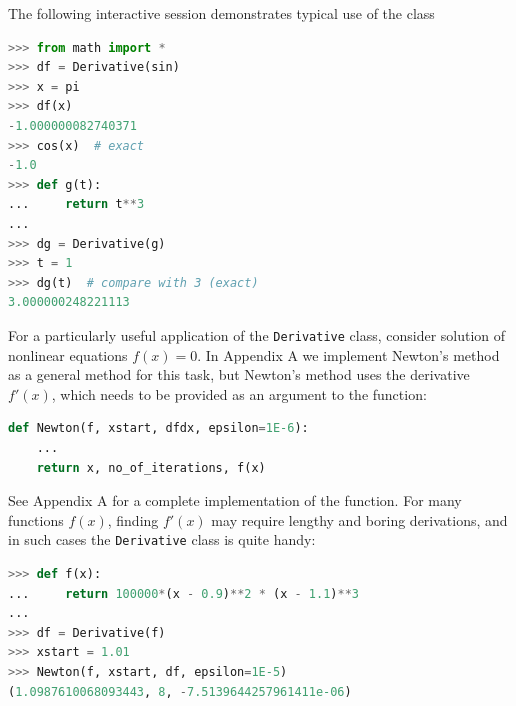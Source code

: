 \documentclass[graybox,envcountchap,sectrefs,final]{svmonodo}
\begin{document}
The following interactive session demonstrates typical use of the class
\begin{lstlisting}[language=Python,style=blue1]
>>> from math import *
>>> df = Derivative(sin)
>>> x = pi
>>> df(x)
-1.000000082740371
>>> cos(x)  # exact
-1.0
>>> def g(t):
...     return t**3
...
>>> dg = Derivative(g)
>>> t = 1
>>> dg(t)  # compare with 3 (exact)
3.000000248221113
\end{lstlisting}
For a particularly useful application of the \texttt{Derivative} class, consider solution of nonlinear equations $f(x)=0$.
In Appendix A we implement Newton's method as a general method for this task, but Newton's method uses
the derivative $f'(x)$, which needs to be provided as an argument to the function:
\begin{lstlisting}[language=Python,style=blue1]
def Newton(f, xstart, dfdx, epsilon=1E-6):
    ...
    return x, no_of_iterations, f(x)
\end{lstlisting}
See Appendix A for a complete implementation of the function. For many functions $f(x)$, finding $f'(x)$ may require lengthy
and boring derivations, and in such cases the \texttt{Derivative} class is quite handy:
\begin{lstlisting}[language=Python,style=blue1]
>>> def f(x):
...     return 100000*(x - 0.9)**2 * (x - 1.1)**3
...
>>> df = Derivative(f)
>>> xstart = 1.01
>>> Newton(f, xstart, df, epsilon=1E-5)
(1.0987610068093443, 8, -7.5139644257961411e-06)
\end{lstlisting}
\end{document}
